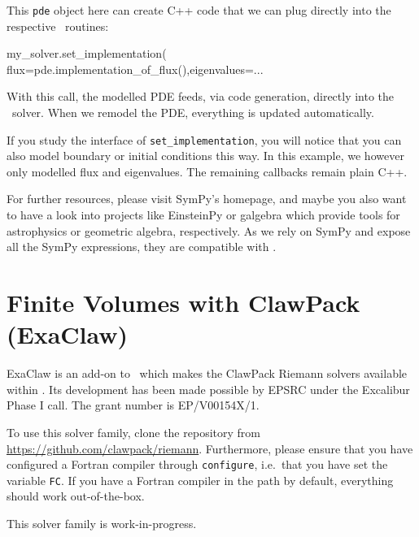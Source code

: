 \noindent
This \texttt{pde} object here can create C++ code that we can plug directly into
the respective \Peano\ routines:
\begin{code}
my_solver.set_implementation( flux=pde.implementation_of_flux(),eigenvalues=...
\end{code}

\noindent
With this call, the modelled PDE feeds, via code generation, directly into the
\ExaHyPE\ solver. When we remodel the PDE, everything is updated automatically.


If you study the interface of \texttt{set\_implementation}, you will notice that
you can also model boundary or initial conditions this way.
In this example, we however only modelled flux and eigenvalues.
The remaining callbacks remain plain C++.


For further resources, please visit SymPy's homepage, and maybe you also want to
have a look into projects like EinsteinPy or galgebra which provide tools for
astrophysics or geometric algebra, respectively.
As we rely on SymPy and expose all the SymPy expressions, they are compatible
with \ExaHyPE.




\section{Finite Volumes with ClawPack (ExaClaw)}

ExaClaw is an add-on to \ExaHyPE\ which makes
the ClawPack Riemann solvers available within \ExaHyPE.
Its development has been made possible by EPSRC under the Excalibur
Phase I call.
The grant number is EP/V00154X/1.



To use this solver family, clone the repository from
\url{https://github.com/clawpack/riemann}.
Furthermore, please ensure that you have configured a Fortran compiler through
\texttt{configure}, i.e.~that you have set the variable \texttt{FC}.
If you have a Fortran compiler in the path by default, everything should work
out-of-the-box.

\begin{remark}
 This solver family is work-in-progress.
\end{remark}



 


